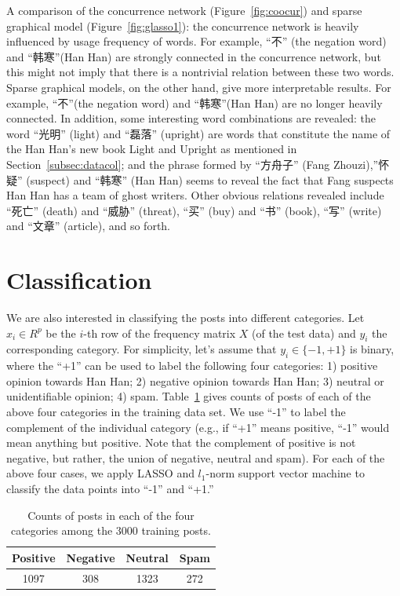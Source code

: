 \documentclass[11pt]{article}
\newcommand{\1}[1]{{\mathbf 1}\left\{#1\right\}}        %
\begin{document}
A comparison of the concurrence network (Figure~\ref{fig:coocur}) and sparse graphical model (Figure~\ref{fig:glasso1}): the concurrence network is heavily influenced by usage frequency of words. For example, ``不'' (the negation word) and ``韩寒''(Han Han) are strongly connected in the concurrence network, but this might not imply that there is a nontrivial relation between these two words. Sparse graphical models, on the other hand, give more interpretable results. For example,  ``不''(the negation word) and ``韩寒''(Han Han) are no longer heavily connected. In addition, some interesting word combinations are revealed: the word ``光明'' (light) and ``磊落'' (upright) are words that constitute the name of the Han Han's new book {Light and Upright} as mentioned in Section~\ref{subsec:datacol}; and the phrase formed by ``方舟子'' (Fang Zhouzi),''怀疑'' (suspect) and  ``韩寒'' (Han Han) seems to reveal the fact that Fang suspects Han Han has a team of ghost writers. Other obvious relations revealed include ``死亡'' (death) and ``威胁'' (threat), ``买'' (buy) and ``书'' (book), ``写'' (write) and ``文章'' (article),  and so forth.

\section{Classification}

We are also interested in classifying the posts into different categories. Let $x_i\in R^{p}$ be the $i$-th row of the frequency matrix $X$ (of the test data) and $y_i$ the corresponding category. For simplicity, let's assume that $y_i\in\{-1,+1\}$ is binary, where the ``+1'' can be used to label the following four categories: 1) positive opinion towards Han Han; 2) negative opinion towards Han Han; 3) neutral or unidentifiable opinion; 4) spam. Table~\ref{tb:traincounts} gives counts of posts of each of the above four categories in the training data set. We use ``-1'' to label the complement of the individual category (e.g., if ``+1'' means positive, ``-1'' would mean anything but positive. Note that the complement of positive is not negative, but rather, the union of negative, neutral and spam). For each of the above four cases, we apply LASSO and $l_1$-norm support vector machine to classify the data points into ``-1'' and ``+1.''

\begin{table}[!h]
\caption{Counts of posts in each of the four categories among the 3000 training posts.}
\begin{center}
\begin{tabular}{|c|c|c|c|}
\hline
Positive & Negative & Neutral & Spam \\ \hline
 1097      & 308   &   1323   &  272 \\ \hline
\end{tabular}
\end{center}
\label{tb:traincounts}
\end{table}%
\end{document}
